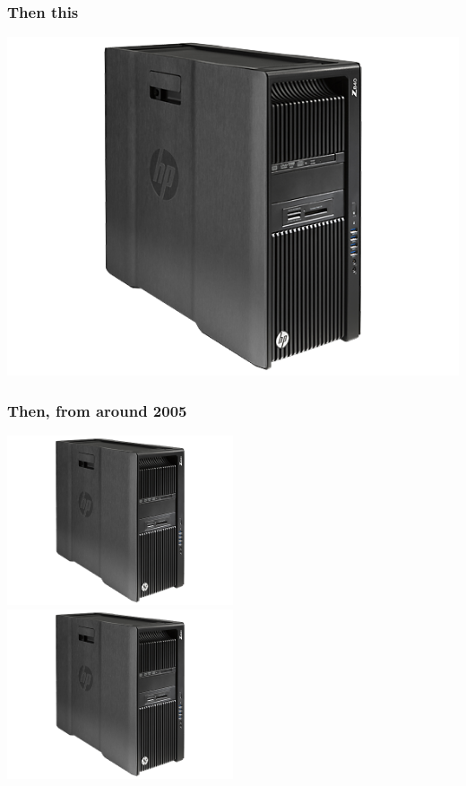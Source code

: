 \documentclass{beamer}
\begin{document}
\begin{frame}
  \frametitle{Then this}
  \begin{center}
    \includegraphics[width=\textwidth]{img/hp.jpg}
  \end{center}
\end{frame}

\begin{frame}
  \frametitle{Then, from around 2005}
  \begin{center}
    \includegraphics[width=0.5\textwidth]{img/hp.jpg}
    \includegraphics[width=0.5\textwidth]{img/hp.jpg}
  \end{center}
\end{frame}
\end{document}

